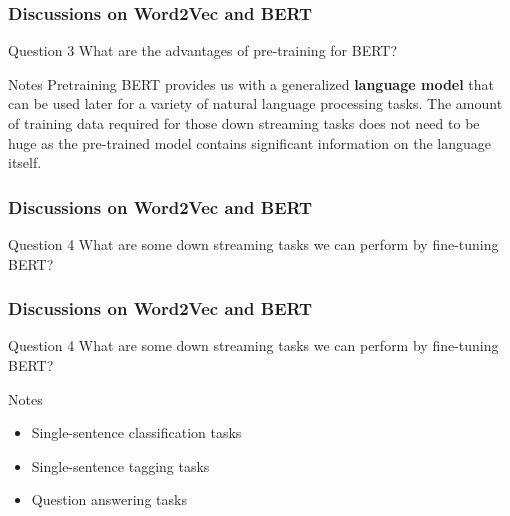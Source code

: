 \documentclass{beamer}
\begin{document}
\begin{frame}
    \frametitle{Discussions on Word2Vec and BERT}
    \begin{block}{Question 3}
        What are the advantages of pre-training for BERT? 
    \end{block}
    
    \begin{block}{Notes}
        Pretraining BERT provides us with a generalized \textbf{language model} that can be used later for a variety of natural language processing tasks. The amount of training data required for those down streaming tasks does not need to be huge as the pre-trained model contains significant information on the language itself. 
    \end{block}
\end{frame}

\begin{frame}
    \frametitle{Discussions on Word2Vec and BERT}
    \begin{block}{Question 4}
        What are some down streaming tasks we can perform by fine-tuning BERT? 
    \end{block}
\end{frame}

\begin{frame}
    \frametitle{Discussions on Word2Vec and BERT}
    \begin{block}{Question 4}
        What are some down streaming tasks we can perform by fine-tuning BERT? 
    \end{block}
    
    \begin{block}{Notes}
        \begin{itemize}
            \item Single-sentence classification tasks
            \item Single-sentence tagging tasks
            \item Question answering tasks
        \end{itemize}
    \end{block}
\end{frame}

%
\end{document}
